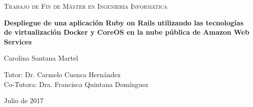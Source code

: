 \begin{titlepage}
	\centering
	\begin{figure}[H]
        \centering
	\end{figure}\par\vspace{1cm}
	{\scshape\Large Trabajo de Fin de Máster en Ingeniería Informática\par}
	\vspace{1.5cm}
	{\huge\bfseries Despliegue de una aplicación Ruby on Rails utilizando las tecnologías de virtualización Docker y CoreOS en la nube pública de Amazon Web Services\par}
	\vspace{2.5cm}
	{\Large Carolina Santana Martel\par}
	\vspace{1.5cm}
	\large Tutor: Dr. Carmelo Cuenca Hernández \\
        \vspace{0.5cm}
	\large Co-Tutora: Dra. Francisca Quintana Domínguez \\ 
        \vspace{1.5cm}
	{\large Julio de 2017\par}
\end{titlepage}

